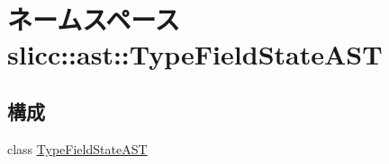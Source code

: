 \hypertarget{namespaceslicc_1_1ast_1_1TypeFieldStateAST}{
\section{ネームスペース slicc::ast::TypeFieldStateAST}
\label{namespaceslicc_1_1ast_1_1TypeFieldStateAST}
}
\subsection*{構成}
\begin{DoxyCompactItemize}
\item 
class \hyperlink{classslicc_1_1ast_1_1TypeFieldStateAST_1_1TypeFieldStateAST}{TypeFieldStateAST}
\end{DoxyCompactItemize}
